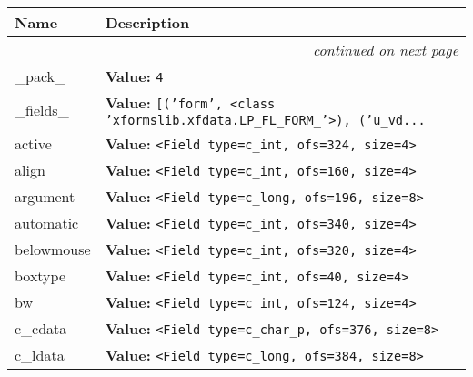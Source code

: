     \vspace{-1cm}
\hspace{\varindent}\begin{longtable}{|p{\varnamewidth}|p{\vardescrwidth}|l}
\cline{1-2}
\cline{1-2} \centering \textbf{Name} & \centering \textbf{Description}& \\
\cline{1-2}
\endhead\cline{1-2}\multicolumn{3}{r}{\small\textit{continued on next page}}\\\endfoot\cline{1-2}
\endlastfoot\raggedright \_\-p\-a\-c\-k\-\_\- & \raggedright \textbf{Value:} 
{\tt 4}&\\
\cline{1-2}
\raggedright \_\-f\-i\-e\-l\-d\-s\-\_\- & \raggedright \textbf{Value:} 
{\tt \texttt{[}\texttt{(}\texttt{'}\texttt{form}\texttt{'}\texttt{, }{\textless}class 'xformslib.xfdata.LP\_FL\_FORM\_'{\textgreater}\texttt{)}\texttt{, }\texttt{(}\texttt{'}\texttt{u\_vd}\texttt{...}}&\\
\cline{1-2}
\raggedright a\-c\-t\-i\-v\-e\- & \raggedright \textbf{Value:} 
{\tt {\textless}Field type=c\_int, ofs=324, size=4{\textgreater}}&\\
\cline{1-2}
\raggedright a\-l\-i\-g\-n\- & \raggedright \textbf{Value:} 
{\tt {\textless}Field type=c\_int, ofs=160, size=4{\textgreater}}&\\
\cline{1-2}
\raggedright a\-r\-g\-u\-m\-e\-n\-t\- & \raggedright \textbf{Value:} 
{\tt {\textless}Field type=c\_long, ofs=196, size=8{\textgreater}}&\\
\cline{1-2}
\raggedright a\-u\-t\-o\-m\-a\-t\-i\-c\- & \raggedright \textbf{Value:} 
{\tt {\textless}Field type=c\_int, ofs=340, size=4{\textgreater}}&\\
\cline{1-2}
\raggedright b\-e\-l\-o\-w\-m\-o\-u\-s\-e\- & \raggedright \textbf{Value:} 
{\tt {\textless}Field type=c\_int, ofs=320, size=4{\textgreater}}&\\
\cline{1-2}
\raggedright b\-o\-x\-t\-y\-p\-e\- & \raggedright \textbf{Value:} 
{\tt {\textless}Field type=c\_int, ofs=40, size=4{\textgreater}}&\\
\cline{1-2}
\raggedright b\-w\- & \raggedright \textbf{Value:} 
{\tt {\textless}Field type=c\_int, ofs=124, size=4{\textgreater}}&\\
\cline{1-2}
\raggedright c\-\_\-c\-d\-a\-t\-a\- & \raggedright \textbf{Value:} 
{\tt {\textless}Field type=c\_char\_p, ofs=376, size=8{\textgreater}}&\\
\cline{1-2}
\raggedright c\-\_\-l\-d\-a\-t\-a\- & \raggedright \textbf{Value:} 
{\tt {\textless}Field type=c\_long, ofs=384, size=8{\textgreater}}&\\

\end{longtable}
